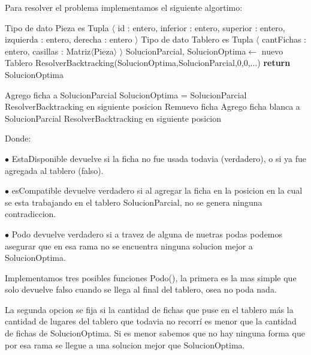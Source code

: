 Para resolver el problema implementamos el siguiente algortimo:

\begin{pseudo}
\State Tipo de dato Pieza es Tupla $\langle$ id : entero, inferior : entero, superior : entero, izquierda : entero, derecha : entero $\rangle$
\State Tipo de dato Tablero es Tupla $\langle$ cantFichas : entero, casillas : Matriz$\langle$Pieza$\rangle$ $\rangle$
        \State SolucionParcial, SolucionOptima$\leftarrow$ nuevo Tablero
        \State ResolverBacktracking(SolucionOptima,SolucionParcial,0,0,...) 
        \State \textbf{return} SolucionOptima
    \EndProcedure
\end{pseudo}

\begin{pseudo}

	    \State Agrego ficha a SolucionParcial
	      \State SolucionOptima = SolucionParcial
	    \EndIf
	      \State ResolverBacktracking en siguiente posicion
	    \EndIf
	    \State Remuevo ficha 
	  \EndIf
	\EndFor
        \State Agrego ficha blanca a SolucionParcial
        \State ResolverBacktracking en siguiente posicion
    \EndProcedure
\end{pseudo}

Donde: 

$\bullet$ EstaDisponible devuelve si la ficha no fue usada todavia (verdadero), o si ya fue agregada al tablero (falso).

$\bullet$ esCompatible devuelve verdadero si al agregar la ficha en la posicion en la cual se esta trabajando en el tablero SolucionParcial, no se genera ninguna contradiccion.

$\bullet$ Podo devuelve verdadero si a travez de alguna de nuetras podas podemos asegurar que en esa rama no se encuentra ninguna solucion mejor a SolucionOptima.

Implementamos tres posibles funciones Podo(), la primera es la mas simple que solo devuelve falso cuando se llega al final del tablero, osea no poda nada.

La segunda opcion se fija si la cantidad de fichas que puse en el tablero más la cantidad de lugares del tablero que todavia no recorrí es menor que la cantidad de fichas de SolucionOptima. Si es menor sabemos que no hay ninguna forma que por esa rama se llegue a una solucion mejor que SolucionOptima.

